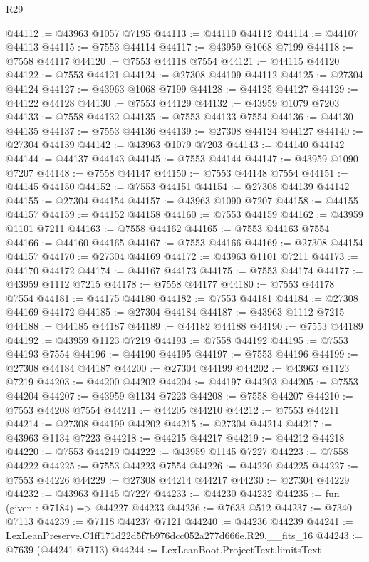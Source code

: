 \begin{lexlean}{R29}
\begin{coremodule}
@44112 := @43963 @1057 @7195
@44113 := @44110 @44112
@44114 := @44107 @44113
@44115 := @7553 @44114
@44117 := @43959 @1068 @7199
@44118 := @7558 @44117
@44120 := @7553 @44118 @7554
@44121 := @44115 @44120
@44122 := @7553 @44121
@44124 := @27308 @44109 @44112
@44125 := @27304 @44124
@44127 := @43963 @1068 @7199
@44128 := @44125 @44127
@44129 := @44122 @44128
@44130 := @7553 @44129
@44132 := @43959 @1079 @7203
@44133 := @7558 @44132
@44135 := @7553 @44133 @7554
@44136 := @44130 @44135
@44137 := @7553 @44136
@44139 := @27308 @44124 @44127
@44140 := @27304 @44139
@44142 := @43963 @1079 @7203
@44143 := @44140 @44142
@44144 := @44137 @44143
@44145 := @7553 @44144
@44147 := @43959 @1090 @7207
@44148 := @7558 @44147
@44150 := @7553 @44148 @7554
@44151 := @44145 @44150
@44152 := @7553 @44151
@44154 := @27308 @44139 @44142
@44155 := @27304 @44154
@44157 := @43963 @1090 @7207
@44158 := @44155 @44157
@44159 := @44152 @44158
@44160 := @7553 @44159
@44162 := @43959 @1101 @7211
@44163 := @7558 @44162
@44165 := @7553 @44163 @7554
@44166 := @44160 @44165
@44167 := @7553 @44166
@44169 := @27308 @44154 @44157
@44170 := @27304 @44169
@44172 := @43963 @1101 @7211
@44173 := @44170 @44172
@44174 := @44167 @44173
@44175 := @7553 @44174
@44177 := @43959 @1112 @7215
@44178 := @7558 @44177
@44180 := @7553 @44178 @7554
@44181 := @44175 @44180
@44182 := @7553 @44181
@44184 := @27308 @44169 @44172
@44185 := @27304 @44184
@44187 := @43963 @1112 @7215
@44188 := @44185 @44187
@44189 := @44182 @44188
@44190 := @7553 @44189
@44192 := @43959 @1123 @7219
@44193 := @7558 @44192
@44195 := @7553 @44193 @7554
@44196 := @44190 @44195
@44197 := @7553 @44196
@44199 := @27308 @44184 @44187
@44200 := @27304 @44199
@44202 := @43963 @1123 @7219
@44203 := @44200 @44202
@44204 := @44197 @44203
@44205 := @7553 @44204
@44207 := @43959 @1134 @7223
@44208 := @7558 @44207
@44210 := @7553 @44208 @7554
@44211 := @44205 @44210
@44212 := @7553 @44211
@44214 := @27308 @44199 @44202
@44215 := @27304 @44214
@44217 := @43963 @1134 @7223
@44218 := @44215 @44217
@44219 := @44212 @44218
@44220 := @7553 @44219
@44222 := @43959 @1145 @7227
@44223 := @7558 @44222
@44225 := @7553 @44223 @7554
@44226 := @44220 @44225
@44227 := @7553 @44226
@44229 := @27308 @44214 @44217
@44230 := @27304 @44229
@44232 := @43963 @1145 @7227
@44233 := @44230 @44232
@44235 := fun (given : @7184) => @44227 @44233
@44236 := @7633 @512
@44237 := @7340 @7113
@44239 := @7118 @44237 @7121
@44240 := @44236 @44239
@44241 := LexLeanPreserve.C1ff171d22d5f7b976dcc052a277d666e.R29.__fits_16
@44243 := @7639 (@44241 @7113)
@44244 := LexLeanBoot.ProjectText.limitsText

\end{coremodule}
\end{lexlean}
